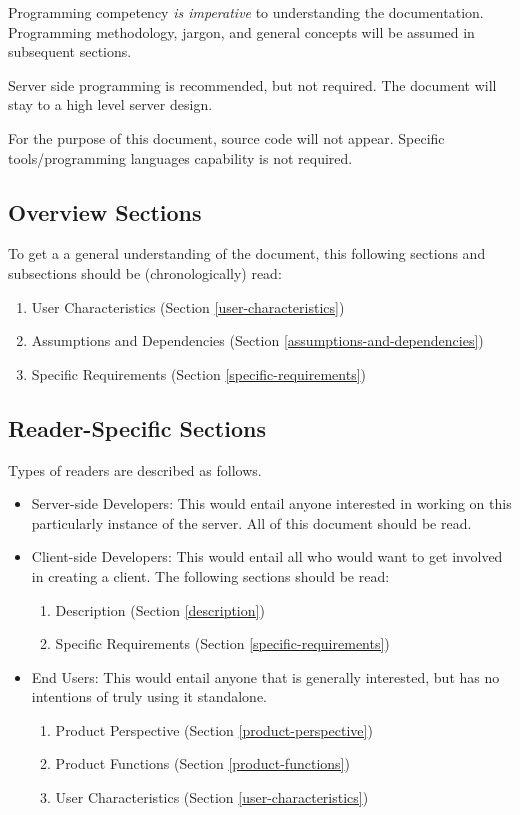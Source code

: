 Programming competency \emph{is imperative} to understanding the
documentation. Programming methodology, jargon, and general concepts
will be assumed in subsequent sections.

Server side programming is recommended, but not required. The document
will stay to a high level server design.

For the purpose of this document, source code will not appear. Specific
tools/programming languages capability is not required.

\subsection{Overview Sections}\label{overview-sections}

To get a a general understanding of the document, this following
sections and subsections should be (chronologically) read:

\begin{enumerate}
    \item User Characteristics (Section \ref{user-characteristics})
    \item Assumptions and Dependencies (Section \ref{assumptions-and-dependencies})
    \item Specific Requirements (Section \ref{specific-requirements})
\end{enumerate}

\subsection{Reader-Specific Sections}\label{reader-specific-sections}

Types of readers are described as follows.

\begin{itemize}
    \item Server-side Developers: This would entail anyone interested in working
    on this particularly instance of the server. All of this document
    should be read.
    \item Client-side Developers: This would entail all who would want to get
    involved in creating a client. The following sections should be read:
    \begin{enumerate}
        \item Description (Section \ref{description})
        \item Specific Requirements (Section \ref{specific-requirements})
    \end{enumerate}

    \item End Users: This would entail anyone that is generally interested, but
    has no intentions of truly using it standalone.
    \begin{enumerate}
      \item Product Perspective (Section \ref{product-perspective})
      \item Product Functions (Section \ref{product-functions})
      \item User Characteristics (Section \ref{user-characteristics})
    \end{enumerate}
\end{itemize}

